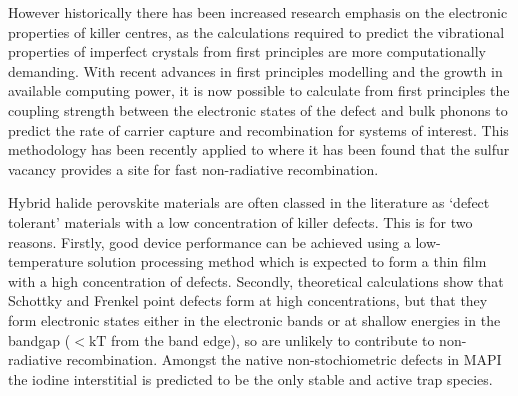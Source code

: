 However historically there has been increased research emphasis on the electronic properties of killer centres, as the calculations required to predict the vibrational properties of imperfect crystals from first principles are more computationally demanding.
With recent advances in first principles modelling \autocite{Alkauskas2014,Alkauskas2016} and the growth in available computing power,\autocite{top500}
it is now possible to calculate from first principles the coupling strength between the electronic states of the defect and bulk phonons to predict the rate of carrier capture and recombination for systems of interest. 
This methodology has been recently applied to  where it has been found that the sulfur vacancy provides a site for fast non-radiative recombination.\autocite{Kim2018}

Hybrid halide perovskite materials are often classed in the literature as `defect tolerant' materials with a low concentration of killer defects. This is for two reasons. 
Firstly, good device performance can be achieved using a low-temperature solution processing method which is expected to form a thin film with a high concentration of defects. 
Secondly, theoretical calculations show that Schottky and Frenkel point defects form at high concentrations, but that they form electronic states either in the electronic bands or at shallow energies in the bandgap ($< \mathrm{kT}$ from the band edge), so are unlikely to contribute to non-radiative recombination.\autocite{Walsh2014b} 
Amongst the native non-stochiometric defects in MAPI the iodine interstitial is predicted to be the only stable and active trap species.\autocite{Meggiolaro2018}



